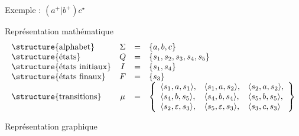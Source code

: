 
\begingroup

\begin{frame}{Exemple : $(a^+ | b^+) c^\star$}
  \vspace{-3mm}
  \begin{block}{Représentation mathématique}
    \vspace{-7mm}
    $$\begin{array}{lccl}
      \text{\structure{alphabet}} & \Sigma & = & \{a, b, c\}\\
      \text{\structure{états}} & Q & = & \{s_1, s_2, s_3, s_4, s_5\}\\
      \text{\structure{états initiaux}} & I & = & \{s_1, s_4\}\\
      \text{\structure{états finaux}} & F & = & \{s_3\}\\
      \text{\structure{transitions}} & \mu & = & \left\{ \begin{array}{lll}
        
        \langle s_1, a, s_1 \rangle,&
        \langle s_1, a, s_2 \rangle,&
        \langle s_2, a, s_2 \rangle,\\

        \langle s_4, b, s_5 \rangle,&
        \langle s_4, b, s_4 \rangle,&
        \langle s_5, b, s_5 \rangle,\\

        \langle s_2, \varepsilon, s_3 \rangle,&
        \langle s_5, \varepsilon, s_3 \rangle,&
        \langle s_3, c, s_3 \rangle
      \end{array}\right\}\\
    \end{array}$$
  \end{block}
  \vspace{-3mm}

  \noindent\begin{minipage}{.49\textwidth}
  \begin{block}{Représentation graphique}
\end{block}
\end{minipage}
\end{frame}
